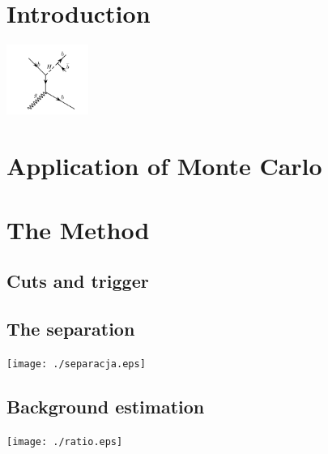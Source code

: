 \documentclass[a1,portrait]{a0poster}
\begin{document}
\begin{multicols}{2} %
\color{3} %

\section*{Introduction}

 \begin{center}
   \includegraphics[width=0.20\textwidth]{./feynman.pdf}
 \end{center}
 
\color{Black} %

\section*{Application of Monte Carlo}


\section*{The Method}

\subsection*{Cuts and trigger}


\subsection*{The separation}

\begin{center}
  \texttt{[image: ./separacja.eps]}
\end{center}

\subsection*{Background estimation}

\begin{center}
  \texttt{[image: ./ratio.eps]}%
\end{center}


\end{multicols}
\end{document}
